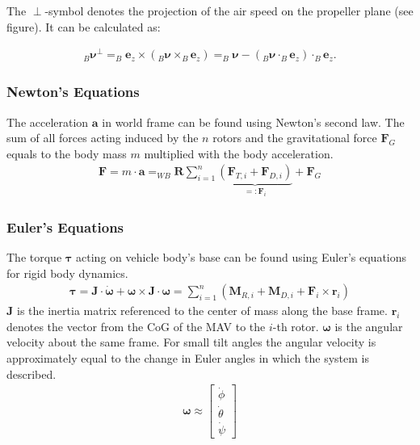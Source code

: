 The $\perp$-symbol denotes the projection of the air speed on the propeller plane (see figure). It can be calculated as:

\begin{align}
_B\mathbf{\boldsymbol{\nu}}^\perp = _B\mathbf{e}_z \times (_B\mathbf{\boldsymbol{\nu}} \times _B\mathbf{e}_z) = _B\mathbf{\boldsymbol{\nu}} - ( _B\mathbf{\boldsymbol{\nu}} \cdot _B\mathbf{e}_z) \cdot _B\mathbf{e}_z .
\end{align}

\subsubsection{Newton's Equations}
The acceleration $\mathbf{a}$ in world frame can be found using Newton's second law. The sum of all forces acting induced by the $n$ rotors and the gravitational force $\mathbf{F}_G$ equals to the body mass $m$ multiplied with the body acceleration.
\begin{align}
\mathbf{F} = m \cdot \mathbf{a} = _{WB}\mathbf{R} \sum_{i=1}^n \underbrace{\left(\mathbf{F}_{T,i} + \mathbf{F}_{D,i} \right)}_{=:\mathbf{F}_i} + \mathbf{F}_G \label{eq:newton}
\end{align}

\subsubsection{Euler's Equations}
The torque $\boldsymbol{\tau}$ acting on vehicle body's base can be found using Euler's equations for rigid body dynamics.
\begin{align}
\boldsymbol{\tau} = \mathbf{J} \cdot  \mathbf{\dot{\boldsymbol{\omega}}} + \boldsymbol{\omega} \times \mathbf{J} \cdot \boldsymbol{\omega} = \sum_{i=1}^n \left( \mathbf{M}_{R,i}+ \mathbf{M}_{D,i} + \mathbf{F}_i \times \mathbf{r}_i \right)  \label{eq:euler}
\end{align}
$\mathbf{J}$  is the inertia matrix referenced to the center of mass along the base frame. $\mathbf{r}_i$ denotes the vector from the CoG of the MAV to the $i$-th rotor. $\boldsymbol{\omega}$ is the angular velocity about the same frame. For small tilt angles the angular velocity is approximately equal to the change in Euler angles in which the system is described.
\begin{align}
\boldsymbol{\omega} \approx \begin{bmatrix}
\dot\phi \\ \dot\theta \\ \dot\psi
\end{bmatrix}
\end{align}


